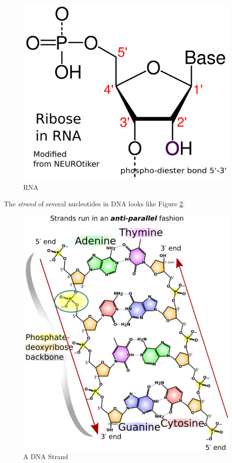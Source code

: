 \documentclass[12pt]{article}
\begin{document}
\begin{figure}[ht!]
    \centering
    \includegraphics[width=0.5\linewidth]{rna-ribose-numbering-std-notation.png}
    \caption{RNA}
    \label{fig: rna}
\end{figure}

The \emph{strand} of several nucleotides in DNA looks like Figure \ref{fig: dna-strand}.

\begin{figure}[ht!]
    \centering
    \includegraphics[width=0.6\linewidth]{DNA_chemical_structure-madprime.png}
    \caption{A DNA Strand}
    \label{fig: dna-strand}
\end{figure}
\end{document}
